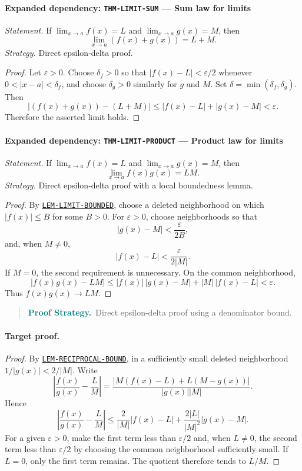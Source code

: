 \documentclass[10pt]{article}
\newcommand{\pidraw}[1]{\begingroup\urlstyle{tt}\nolinkurl{#1}\endgroup}
\newcommand{\pidref}[1]{\hyperref[prf:#1]{\pidraw{#1}}}
\newcommand{\pid}[1]{\pidref{#1}}
\theoremstyle{definition}
\theoremstyle{remark}
\newenvironment{proofstrategy}
{\begin{quote}\small\noindent\textbf{\textcolor{teal}{Proof Strategy.}}\ }
{\end{quote}}
\begin{document}
\paragraph{Expanded dependency: \pidraw{THM-LIMIT-SUM} --- Sum law for limits}
\textit{Statement.} If $\lim_{x\to a}f(x)=L$ and $\lim_{x\to a}g(x)=M$, then
\[
\lim_{x\to a}(f(x)+g(x))=L+M.
\]
\textit{Strategy.} Direct epsilon-delta proof.
\begin{proof}Let $\varepsilon>0$. Choose $\delta_f>0$ so that
$|f(x)-L|<\varepsilon/2$ whenever $0<|x-a|<\delta_f$, and choose
$\delta_g>0$ similarly for $g$ and $M$. Set
$\delta=\min(\delta_f,\delta_g)$. Then
\[
|(f(x)+g(x))-(L+M)|
\le |f(x)-L|+|g(x)-M|<\varepsilon.
\]
Therefore the asserted limit holds.\end{proof}

\paragraph{Expanded dependency: \pidraw{THM-LIMIT-PRODUCT} --- Product law for limits}
\textit{Statement.} If $\lim_{x\to a}f(x)=L$ and $\lim_{x\to a}g(x)=M$, then
\[
\lim_{x\to a}f(x)g(x)=LM.
\]
\textit{Strategy.} Direct epsilon-delta proof with a local boundedness lemma.
\begin{proof}By \pid{LEM-LIMIT-BOUNDED}, choose a deleted neighborhood on which
$|f(x)|\le B$ for some $B>0$. For $\varepsilon>0$, choose neighborhoods so that
\[
|g(x)-M|<\frac{\varepsilon}{2B},
\]
and, when $M\ne0$,
\[
|f(x)-L|<\frac{\varepsilon}{2|M|}.
\]
If $M=0$, the second requirement is unnecessary. On the common neighborhood,
\[
|f(x)g(x)-LM|
\le |f(x)|\,|g(x)-M|+|M|\,|f(x)-L|<\varepsilon.
\]
Thus $f(x)g(x)\to LM$.\end{proof}

\begin{proofstrategy}Direct epsilon-delta proof using a denominator bound.\end{proofstrategy}

\paragraph{Target proof.}

\begin{proof}

By \pid{LEM-RECIPROCAL-BOUND}, in a sufficiently small deleted neighborhood
$1/|g(x)|<2/|M|$. Write
\[
\left|\frac{f(x)}{g(x)}-\frac{L}{M}\right|
=
\frac{|M(f(x)-L)+L(M-g(x))|}{|g(x)||M|}.
\]
Hence
\[
\left|\frac{f(x)}{g(x)}-\frac{L}{M}\right|
\le
\frac{2}{|M|}|f(x)-L|
+\frac{2|L|}{|M|^2}|g(x)-M|.
\]
For a given $\varepsilon>0$, make the first term less than $\varepsilon/2$
and, when $L\ne0$, the second term less than $\varepsilon/2$ by choosing the
common neighborhood sufficiently small. If $L=0$, only the first term remains.
The quotient therefore tends to $L/M$.

\end{proof}
\end{document}
